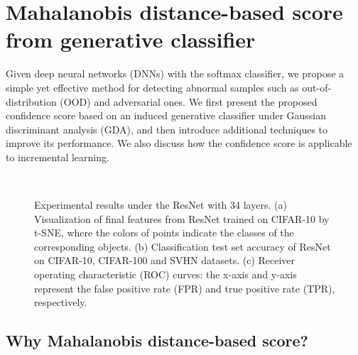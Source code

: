 \documentclass{article}
\begin{document}
\section{{Mahalanobis distance-based score} from generative classifier} \label{sec:main_results}


Given deep neural networks (DNNs) with the softmax classifier,
we propose a simple yet effective method for detecting abnormal samples such as out-of-distribution (OOD) and adversarial ones.
We first present the proposed confidence score based on an induced generative classifier under Gaussian discriminant analysis (GDA),
and then introduce additional techniques to improve its performance.
We also discuss how the confidence score is applicable to incremental learning.

\begin{figure} [t] \centering
{} 
\,
\,
\caption{
Experimental results under the ResNet with 34 layers.
(a) Visualization of final features from ResNet trained on CIFAR-10 by t-SNE, where the colors of points indicate the classes of the corresponding objects. (b) Classification test set accuracy of ResNet on CIFAR-10, CIFAR-100 and SVHN datasets. (c) Receiver operating characteristic (ROC) curves: the x-axis and y-axis represent the false positive rate (FPR) and true positive rate (TPR), respectively.}
\label{fig:justification}
\end{figure}



\subsection{Why Mahalanobis distance-based score?} \label{sec:main_results_score}
\end{document}

